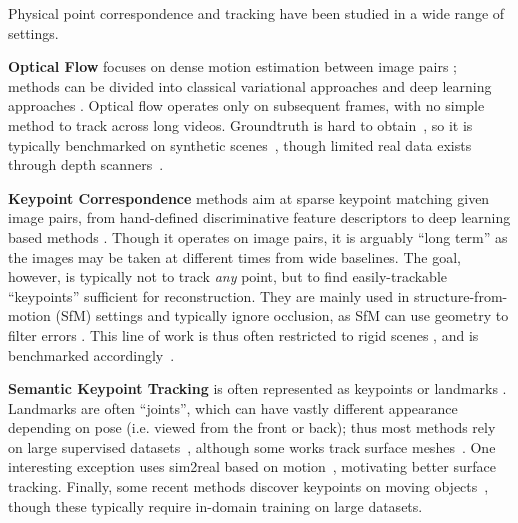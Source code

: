 \documentclass[10pt,twocolumn,letterpaper]{article}
\begin{document}
Physical point correspondence and tracking have been studied in a wide range of settings. 

\noindent \textbf{Optical Flow} focuses on dense motion estimation between image pairs \cite{horn1981determining,lucas1981iterative}; methods can be divided into classical variational approaches \cite{brox2004high,brox2009large} and deep learning approaches \cite{dosovitskiy2015flownet,ilg2017flownet,ranjan2017optical,sun2018pwc,teed2020raft,xu2022gmflow}. Optical flow operates only on subsequent frames, with no simple method to track across long videos. Groundtruth is hard to obtain~\cite{butler2012naturalistic}, so it is typically benchmarked on synthetic scenes~\cite{butler2012naturalistic,dosovitskiy2015flownet,mayer2016large,sun2021autoflow}, though limited real data exists through depth scanners~\cite{geiger2012we}.

\noindent \textbf{Keypoint Correspondence} methods aim at sparse keypoint matching given image pairs, from hand-defined discriminative feature descriptors \cite{sethi1987finding,lowe1999object,lowe2004distinctive,bay2006surf} to deep learning based methods \cite{detone2018superpoint,ono2018lf,jiang2021cotr,manuelli2020keypoints}. Though it operates on image pairs, it is arguably ``long term'' as the images may be taken at different times from wide baselines. The goal, however, is typically not to track \emph{any} point, but to find easily-trackable ``keypoints'' sufficient for reconstruction. They are mainly used in structure-from-motion (SfM) settings and typically ignore occlusion, as SfM can use geometry to filter errors \cite{hartley2003multiple,schonberger2016structure,torr1999feature,vijayanarasimhan2017sfm}. 
This line of work is thus often restricted to rigid scenes \cite{zhang2000flexible,marr1979computational}, and is benchmarked accordingly~\cite{dai2017scannet,schops2017multi,balntas2017hpatches,li2018megadepth,zhou2018stereo,li2019learning}. 

\noindent \textbf{Semantic Keypoint Tracking} is often represented as keypoints or landmarks \cite{jhuang2013towards,ramanan2005strike,tompson2014real,shrivastava2017learning,xiong2013supervised,sun2014deep}. Landmarks are often ``joints'', which can have vastly different appearance depending on pose (i.e. viewed from the front or back); thus most methods rely on large supervised datasets~\cite{cheng2021equivariant,xu2021rethinking,rong2021monocular,zimmermann2019freihand,shen2015first,bartlett2006automatic}, although some works track surface meshes~\cite{von2018recovering,densepose}.  One interesting exception uses sim2real based on motion~\cite{doersch2019sim2real}, motivating better surface tracking.
Finally, some recent methods discover keypoints on moving objects~\cite{jakab2018unsupervised,zhang2018unsupervised,jakab2020self,thewlis2017unsupervised}, though these typically require in-domain training on large datasets.
\end{document}
